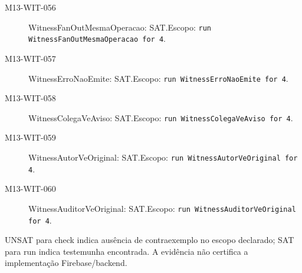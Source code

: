 \begin{description}
\item[M13-WIT-056] WitnessFanOutMesmaOperacao: SAT.\newline Escopo: \texttt{run WitnessFanOutMesmaOperacao for 4}.
\item[M13-WIT-057] WitnessErroNaoEmite: SAT.\newline Escopo: \texttt{run WitnessErroNaoEmite for 4}.
\item[M13-WIT-058] WitnessColegaVeAviso: SAT.\newline Escopo: \texttt{run WitnessColegaVeAviso for 4}.
\item[M13-WIT-059] WitnessAutorVeOriginal: SAT.\newline Escopo: \texttt{run WitnessAutorVeOriginal for 4}.
\item[M13-WIT-060] WitnessAuditorVeOriginal: SAT.\newline Escopo: \texttt{run WitnessAuditorVeOriginal for 4}.
\end{description}
UNSAT para check indica ausência de contraexemplo no escopo declarado; SAT para run indica testemunha encontrada. A evidência não certifica a implementação Firebase/backend.
